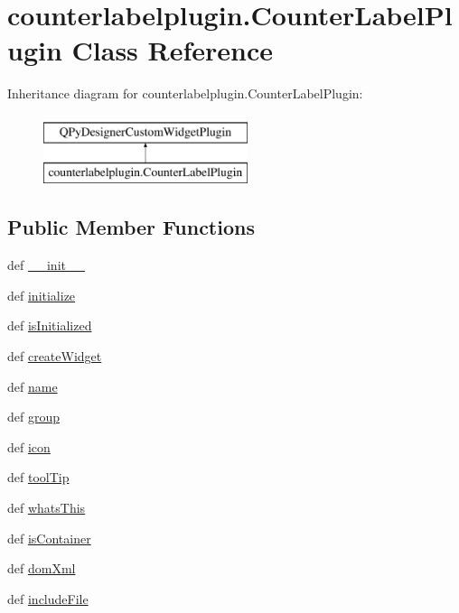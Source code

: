 \hypertarget{classcounterlabelplugin_1_1CounterLabelPlugin}{}\section{counterlabelplugin.\+Counter\+Label\+Plugin Class Reference}
\label{classcounterlabelplugin_1_1CounterLabelPlugin}
Inheritance diagram for counterlabelplugin.\+Counter\+Label\+Plugin\+:\begin{figure}[H]
\begin{center}
\leavevmode
\includegraphics[height=2.000000cm]{classcounterlabelplugin_1_1CounterLabelPlugin}
\end{center}
\end{figure}
\subsection*{Public Member Functions}
\begin{DoxyCompactItemize}
\item 
def \hyperlink{classcounterlabelplugin_1_1CounterLabelPlugin_a293cef0d4941aeac1349d6c4d161bfa6}{\+\_\+\+\_\+init\+\_\+\+\_\+}
\item 
def \hyperlink{classcounterlabelplugin_1_1CounterLabelPlugin_afc4ca0a133dcc935592c0eac272a4c58}{initialize}
\item 
def \hyperlink{classcounterlabelplugin_1_1CounterLabelPlugin_a16e41d1857b026b1ad7c5ea4eaefdf85}{is\+Initialized}
\item 
def \hyperlink{classcounterlabelplugin_1_1CounterLabelPlugin_a85c047fb594bbc630187d8fc3de577fa}{create\+Widget}
\item 
def \hyperlink{classcounterlabelplugin_1_1CounterLabelPlugin_a9b85936e9143318c4e8750c648bc5c3f}{name}
\item 
def \hyperlink{classcounterlabelplugin_1_1CounterLabelPlugin_af811e7318a6adca46580a84764dccd72}{group}
\item 
def \hyperlink{classcounterlabelplugin_1_1CounterLabelPlugin_af36c024218930dfb2587b0499cb99841}{icon}
\item 
def \hyperlink{classcounterlabelplugin_1_1CounterLabelPlugin_a162e74c1d29f13d91c7d79773036d99e}{tool\+Tip}
\item 
def \hyperlink{classcounterlabelplugin_1_1CounterLabelPlugin_ae13e1eeb85460c63a7311c24b7b81cee}{whats\+This}
\item 
def \hyperlink{classcounterlabelplugin_1_1CounterLabelPlugin_a3f761acde17cd0c762b0dc65b6023db5}{is\+Container}
\item 
def \hyperlink{classcounterlabelplugin_1_1CounterLabelPlugin_a04041c9e4f6654f62e152861e575e9a4}{dom\+Xml}
\item 
def \hyperlink{classcounterlabelplugin_1_1CounterLabelPlugin_a4491da6f5db32a3d5fdf935023b7bca0}{include\+File}
\end{DoxyCompactItemize}
